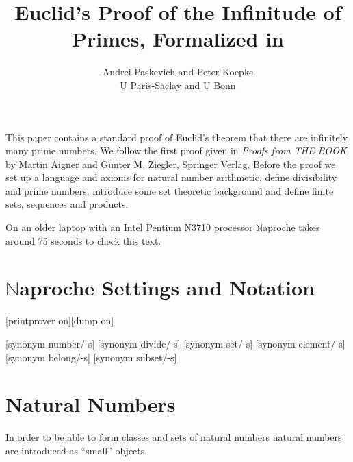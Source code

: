 \documentclass[11pt]{article}
\author{Andrei Paskevich and Peter Koepke\\
   U Paris-Saclay and U Bonn}
\title{Euclid's Proof 
of the Infinitude of Primes, Formalized in \Naproche{}}
\begin{document}
\newcommand{\val}[2]{#1_{#2}}
\newcommand{\Prod}[3]{#1_{#2} \cdots #1_{#3}}
\newcommand{\Seq}[2]{\{#1,\dots,#2\}}
\newcommand{\Set}[3]{\{#1_{#2},\dots,#1_{#3}\}}
\newcommand{\Primes}{\mathbb{P}}
\newcommand{\Naproche}{$\mathbb{N}$aproche}

\maketitle

This paper contains a standard proof of Euclid's theorem 
that there are infinitely many prime numbers. We
follow the first proof given in \emph{Proofs from THE BOOK}
by Martin Aigner and Günter M. Ziegler, Springer Verlag.
Before the proof we 
set up a language and axioms for natural number arithmetic,
define divisibility and prime numbers,
introduce some set theoretic background and define
finite sets, sequences and products.

On an older laptop 
with an Intel Pentium N3710 processor \Naproche{} takes 
around 75 seconds to check this text.


\section{\Naproche{} Settings and Notation}

\begin{forthel}


[printprover on][dump on]

[synonym number/-s]
[synonym divide/-s]
[synonym set/-s] [synonym element/-s] 
[synonym belong/-s] [synonym subset/-s]

\end{forthel}


\section{Natural Numbers}

In order to be able to form classes and sets of natural numbers 
natural numbers are introduced as ``small'' objects.
 
\end{document}
